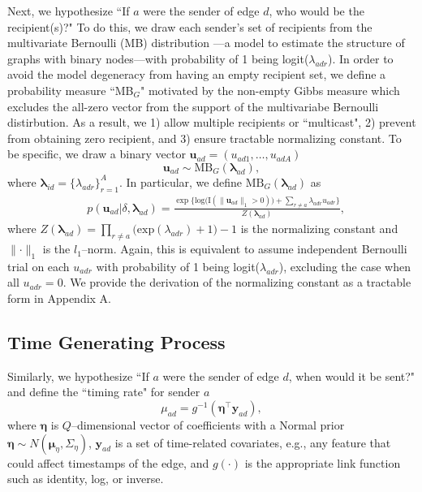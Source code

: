\documentclass[ba]{imsart}
\numberwithin{equation}{section}
\theoremstyle{plain}
\begin{document}
Next, we hypothesize ``If $a$ were the sender of edge $d$, who would be the recipient(s)?" To do this, we draw each sender's set of recipients from the multivariate Bernoulli (MB) distribution \citep{dai2013multivariate}---a model to estimate the structure of graphs with binary nodes---with probability of 1 being logit($\lambda_{adr}$). In order to avoid the model degeneracy from having an empty recipient set, we define a probability measure ``MB$_{G}$" motivated by the non-empty Gibbs measure \citep{fellows2017removing} which excludes the all-zero vector from the support of the multivariabe Bernoulli distirbution. As a result, we 1) allow multiple recipients or ``multicast", 2) prevent from obtaining zero recipient, and 3) ensure tractable normalizing constant. To be specific, we draw a binary vector $\boldsymbol{u}_{ad}= (u_{ad1},
\ldots, u_{adA})$ 
\begin{equation} \boldsymbol{u}_{ad}  \sim
\mbox{MB}_{G}(\boldsymbol{\lambda}_{ad}),
\end{equation}
where $\boldsymbol{\lambda}_{id}= \{\lambda_{adr}\}_{r=1}^A$. In particular, we define $\mbox{MB}_{G}(\boldsymbol{\lambda}_{ad})$ as
\begin{equation}
\begin{aligned}
&p(\boldsymbol{u}_{ad}|\delta, \boldsymbol{\lambda}_{ad}) = \frac{\exp\Big\{\mbox{log}\big(\text{I}( \lVert \boldsymbol{u}_{ad}\rVert_1 > 0 )\big) + \sum_{r\neq a} \lambda_{adr}u_{adr}\Big\}}{Z(\boldsymbol{\lambda}_{ad})} ,
\end{aligned}
\label{eqn:Gibbs}
\end{equation}
where $Z(\boldsymbol{\lambda}_{ad})= \prod_{r \neq a} \big(\mbox{exp}(\lambda_{adr}) + 1\big)-1$ is the normalizing constant and $\lVert \cdot \rVert_1$ is the $l_1$--norm. Again, this is equivalent to assume independent Bernoulli trial on each $u_{adr}$ with probability of 1 being logit($\lambda_{adr}$), excluding the case when all $u_{adr}=0$. We provide the derivation of the normalizing constant as a tractable form in Appendix A. 

\subsection{Time Generating Process}\label{subsec:Time}
Similarly, we hypothesize ``If $a$ were the sender of edge $d$, when would it be sent?" and define the ``timing rate" for sender $a$
\begin{equation}
\mu_{ad} = g^{-1}(\boldsymbol{\eta}^\top \boldsymbol{y}_{ad}),
\end{equation}
where $\boldsymbol{\eta}$ is $Q$--dimensional vector of coefficients with a Normal prior $\boldsymbol{\eta} \sim N(\boldsymbol{\mu}_\eta,\Sigma_\eta)$, $\boldsymbol{y}_{ad}$ is a set of time-related covariates, e.g., any feature that could affect timestamps of the edge, and $g(\cdot)$ is the appropriate link function such as identity, log, or inverse. 
\end{document}
